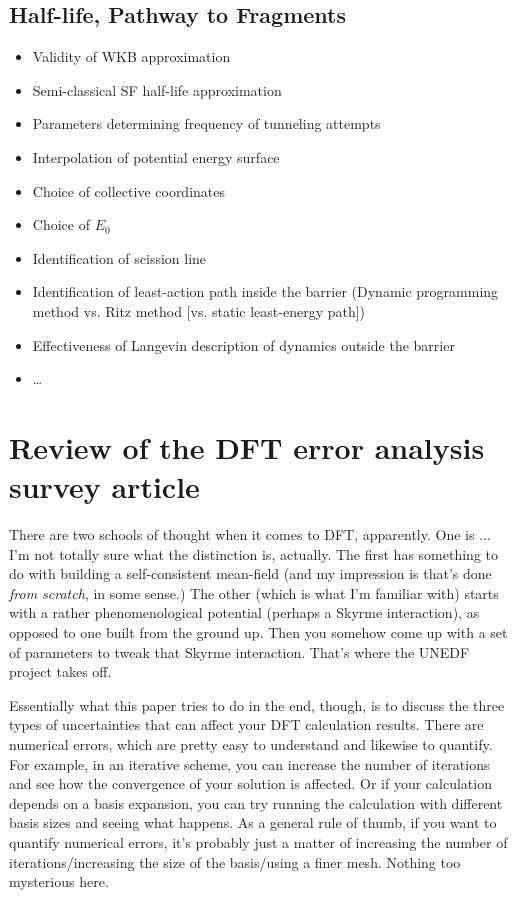 \subsection{Half-life, Pathway to Fragments}
\begin{itemize}
\item Validity of WKB approximation
\item Semi-classical SF half-life approximation
\item Parameters determining frequency of tunneling attempts
\item Interpolation of potential energy surface
\item Choice of collective coordinates
\item Choice of $E_0$ 
\item Identification of scission line
\item Identification of least-action path inside the barrier (Dynamic programming method vs. Ritz method [vs. static least-energy path])
\item Effectiveness of Langevin description of dynamics outside the barrier
\item \dots
\end{itemize}

\section{Review of the DFT error analysis survey article \cite{Schunck2015}}

There are two schools of thought when it comes to DFT, apparently. One is ... I'm not totally sure what the distinction is, actually. The first has something to do with building a self-consistent mean-field (and my impression is that's done \textit{from scratch}, in some sense.) The other (which is what I'm familiar with) starts with a rather phenomenological potential (perhaps a Skyrme interaction), as opposed to one built from the ground up. Then you somehow come up with a set of parameters to tweak that Skyrme interaction. That's where the UNEDF project takes off.

Essentially what this paper tries to do in the end, though, is to discuss the three types of uncertainties that can affect your DFT calculation results. There are numerical errors, which are pretty easy to understand and likewise to quantify. For example, in an iterative scheme, you can increase the number of iterations and see how the convergence of your solution is affected. Or if your calculation depends on a basis expansion, you can try running the calculation with different basis sizes and seeing what happens. As a general rule of thumb, if you want to quantify numerical errors, it's probably just a matter of increasing the number of iterations/increasing the size of the basis/using a finer mesh. Nothing too mysterious here.

